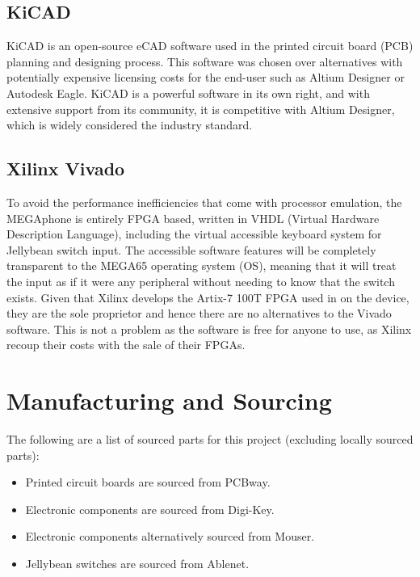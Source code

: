 \subsection{KiCAD}

KiCAD is an open-source eCAD software used in the printed circuit board (PCB) planning and designing process.
This software was chosen over alternatives with potentially expensive licensing costs for the end-user such as Altium Designer or Autodesk Eagle.
KiCAD is a powerful software in its own right, and with extensive support from its community, it is competitive with Altium Designer, which is widely considered the industry standard.


\subsection{Xilinx Vivado}

To avoid the performance inefficiencies that come with processor emulation, the MEGAphone is entirely FPGA based, written in VHDL (Virtual Hardware Description Language), including the virtual accessible keyboard system for Jellybean switch input.
The accessible software features will be completely transparent to the MEGA65 operating system (OS), meaning that it will treat the input as if it were any peripheral without needing to know that the switch exists.
Given that Xilinx develops the Artix-7 100T FPGA used in on the device, they are the sole proprietor and hence there are no alternatives to the Vivado software.
This is not a problem as the software is free for anyone to use, as Xilinx recoup their costs with the sale of their FPGAs.


\section{Manufacturing and Sourcing}

The following are a list of sourced parts for this project (excluding locally sourced parts):

\begin{itemize} 
    \item Printed circuit boards are sourced from PCBway. %
    \item Electronic components are sourced from Digi-Key.
    \item Electronic components alternatively sourced from Mouser.
    \item Jellybean switches are sourced from Ablenet.
    \end{itemize}

